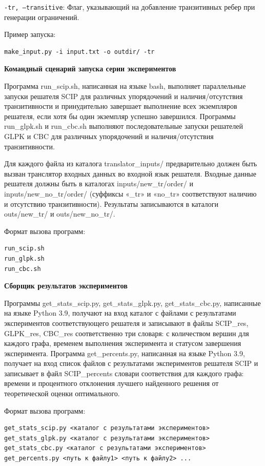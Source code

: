 \texttt{-tr, --transitive}: Флаг, указывающий на добавление транзитивных ребер при генерации ограничений.

\newpage
Пример запуска:
\begin{verbatim}
make_input.py -i input.txt -o outdir/ -tr
\end{verbatim}

\textbf{Командный сценарий запуска серии экспериментов}

Программа run\_scip.sh, написанная на языке bash, выполняет параллельные запуски решателя SCIP для различных упорядочений и наличия/отсутствия транзитивности и принудительно завершает выполнение всех экземпляров решателя, если хотя бы один экземпляр успешно завершился. Программы run\_glpk.sh и run\_cbc.sh выполняют последовательные запуски решателей GLPK и CBC для различных упорядочений и наличия/отсутствия транзитивности.

Для каждого файла из каталога translator\_inputs/ предварительно должен быть вызван транслятор входных данных во входной язык решателя. Входные данные решателя должны быть в каталогах inputs/new\_tr/order/ и inputs/new\_no\_tr/order/ (суффиксы «\_tr» и «no\_tr» соответствуют наличию и отсутствию транзитивности). Результаты записываются в каталоги outs/new\_tr/ и outs/new\_no\_tr/.

Формат вызова программ:
\begin{verbatim}
run_scip.sh
run_glpk.sh
run_cbc.sh
\end{verbatim}

\textbf{Сборщик результатов экспериментов}

Программы get\_stats\_scip.py, get\_stats\_glpk.py, get\_stats\_cbc.py, написанные на языке Python 3.9, получают на вход каталог с файлами с результатами экспериментов соответствующего решателя и записывают в файлы SCIP\_res, GLPK\_res, CBC\_res соответственно три словаря: с количеством вершин для каждого графа, временем выполнения эксперимента и статусом завершения эксперимента. Программа get\_percents.py, написанная на языке Python 3.9, получает на вход список файлов с результатами экспериментов решателя SCIP и записывает в файл SCIP\_percents словари соответствия для каждого графа: времени и процентного отклонения лучшего найденного решения от теоретической оценки оптимального.

Формат вызова программ:
\begin{verbatim}
get_stats_scip.py <каталог c результатами экспериментов>
get_stats_glpk.py <каталог c результатами экспериментов>
get_stats_cbc.py <каталог c результатами экспериментов>
get_percents.py <путь к файлу1> <путь к файлу2> ...
\end{verbatim}


